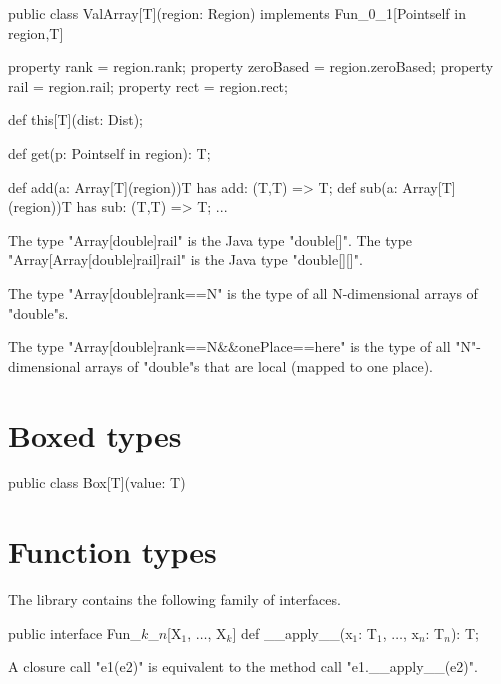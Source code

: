 \begin{xten}
public class ValArray[T](region: Region)
    implements Fun_0_1[Point{self in region},T] {

    property rank = region.rank;
    property zeroBased = region.zeroBased;
    property rail = region.rail;
    property rect = region.rect;

    def this[T](dist: Dist);

    def get(p: Point{self in region}): T;

    def add(a: Array[T](region)){T has add: (T,T) => T};
    def sub(a: Array[T](region)){T has sub: (T,T) => T};
    ...
}
\end{xten}

  The type \xcd"Array[double]{rail}" is the Java type \xcd"double[]".
  The type \xcd"Array[Array[double]{rail}]{rail}" is the Java type \xcd"double[][]".

  The type \xcd"Array[double]{rank==N}" is the type of all N-dimensional arrays of
  \xcd"double"s.

  The type \xcd"Array[double]{rank==N&&onePlace==here}" is the
  type of all \xcd"N"-dimensional
  arrays of \xcd"double"s that are local (mapped to one place).  

\section{Boxed types}

\begin{xten}
public class Box[T](value: T) { }
\end{xten}

\section{Function types}

The library contains the following family of interfaces.

\begin{xtenmath}
public interface Fun_$k$_$n$[X$_1$, $\dots$, X$_k$] {
    def __apply__(x$_1$: T$_1$, $\dots$, x$_n$: T$_n$): T;
}
\end{xtenmath}

A closure call \xcd"e1(e2)" is equivalent to 
the method call \xcd"e1.__apply__(e2)".
